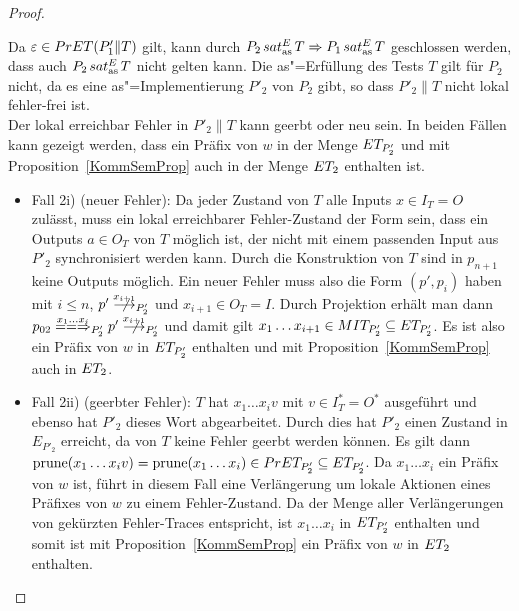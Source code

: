\begin{proof}
\begin{itemize}
\begin{itemize}
      \end{itemize}
      Da $\varepsilon\in PrET (P'_1\|T)$ gilt, kann durch $P_2\hspace{0.05cm}sat_\mathrm{as}^E\hspace{0.05cm} T
      \Rightarrow P_1\hspace{0.05cm}sat_\mathrm{as}^E\hspace{0.05cm} T$ geschlossen werden, dass auch $P_2\hspace{0.05cm}sat_\mathrm{as}^E\hspace{0.05cm} T$
      nicht gelten kann. Die as"=Erfüllung des Tests $T$ gilt für $P_2$ nicht,
      da es eine as"=Implementierung $P'_2$ von $P_2$ gibt, so dass $P'_2\|T$
      nicht lokal fehler-frei ist.\\
      Der lokal erreichbar Fehler in $P'_2\|T$ kann geerbt oder neu sein. In
      beiden Fällen kann gezeigt werden, dass ein Präfix von $w$ in der Menge
      $ET _{P'_2}$ und mit Proposition~\ref{KommSemProp} auch in der Menge
      $ET _2$ enthalten ist.
      \begin{itemize}
        \item Fall 2i) (neuer Fehler): Da jeder Zustand von $T$ alle Inputs
          $x\in I_T=O$ zulässt, muss ein lokal erreichbarer Fehler-Zustand der
          Form sein, dass ein Outputs $a\in O_T$ von $T$ möglich ist, der nicht
          mit einem passenden Input aus $P'_2$ synchronisiert werden kann.
          Durch die Konstruktion von $T$ sind in $p_{n+1}$ keine Outputs
          möglich. Ein neuer Fehler muss also die Form $(p',p_i)$ haben mit
          $i\leq n$, $p'\nmust[x_{i+1}]_{P'_2}$ und $x_{i+1}\in O_T=I$. Durch
          Projektion erhält man dann $p_{02} \lweakmay[x_1\dots x_i]_{P'_2} p'
          \nmust[x_{i+1}]_{P'_2}$ und damit gilt $x_1\dots x_{i+1}\in MIT
          _{P'_2} \subseteq ET _{P'_2}$. Es ist also ein Präfix von $w$ in
          $ET _{P'_2}$ enthalten und mit Proposition~\ref{KommSemProp} auch in
          $ET _2$.
        \item Fall 2ii) (geerbter Fehler): $T$ hat $x_1\dots x_i v$ mit $v\in
          I^*_T =O^*$ ausgeführt und ebenso hat $P'_2$ dieses Wort
          abgearbeitet. Durch dies hat $P'_2$ einen Zustand in $E _{P'_2}$
          erreicht, da von $T$ keine Fehler geerbt werden können. Es gilt dann
          $\mathrm{prune} (x_1\dots x_iv) = \mathrm{prune} (x_1\dots x_i)\in PrET _{P'_2}
          \subseteq ET _{P'_2}$. Da $x_1\dots x_i$ ein Präfix von $w$ ist,
          führt in diesem Fall eine Verlängerung um lokale Aktionen eines
          Präfixes von $w$ zu einem Fehler-Zustand. Da \ET{} der Menge aller
          Verlängerungen von gekürzten Fehler-Traces entspricht, ist $x_1\dots
          x_i$ in $ET _{P'_2}$ enthalten und somit ist mit
          Proposition~\ref{KommSemProp} ein Präfix von $w$ in $ET _2$
          enthalten.
      \end{itemize}

\end{itemize}
\end{proof}
